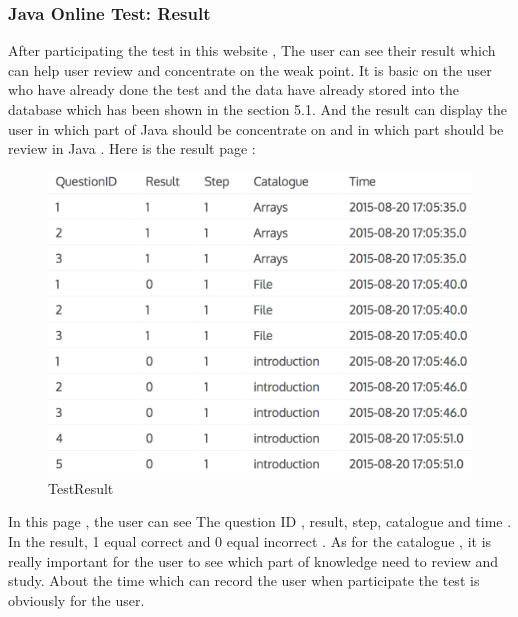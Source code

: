 \documentclass[12pt]{article}
\begin{document}
\subsubsection{Java Online Test: Result}
After participating the test in this website , The user can see their result which can help user review and concentrate on the weak point. It is basic on the user who have already done the test and the data have already stored into the database  which has been shown in the section 5.1.  And the result can display the user in which part of Java should be concentrate on and in which part should be review in Java  . Here is the result page :
\begin{figure}[H]
	\centering	
	\includegraphics[width=15cm]{images/TestResult.jpg}


	\caption[TestResult]{TestResult}
	\label{TestResult}
\end{figure}

	In this page , the user can see The question ID , result, step, catalogue and time . In the result, 1 equal correct and 0 equal incorrect . As for the catalogue ,  it is really important for the user to see which part of knowledge need to review and study. About the time which can record the user  when participate the test is obviously for the user. 
\newpage

\end{document}
